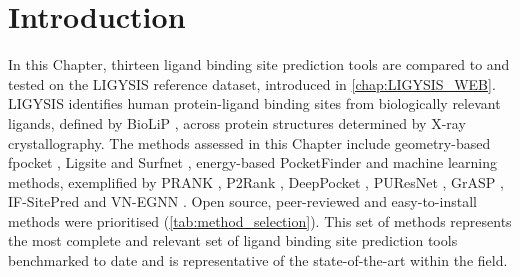 \section{Introduction}


In this Chapter, thirteen ligand binding site prediction tools are compared to and tested on the LIGYSIS reference dataset, introduced in \autoref{chap:LIGYSIS_WEB}. LIGYSIS identifies human protein-ligand binding sites from biologically relevant ligands, defined by BioLiP \cite{YANG_2013_BIOLIP}, across protein structures determined by X-ray crystallography. The methods assessed in this Chapter include geometry-based fpocket \cite{GUILLOUX_2009_FPOCKET}, Ligsite \cite{HENDLICH_1997_LIGSITE} and Surfnet \cite{LASKOWSKI_1995_SURFNET}, energy-based PocketFinder \cite{AN_2005_POCKETFINDER} and machine learning methods, exemplified by PRANK \cite{KRIVAK_2015_PRANK}, P2Rank \cite{KRIVAK_2015_P2RANK, KRIVAK_2018_P2RANK}, DeepPocket \cite{AGGARWAL_2022_DEEPPOCKET}, PUResNet \cite{KANDEL_2021_PURESNET, KANDEL_2024_PURESNET}, GrASP \cite{SMITH_2024_GrASP}, IF-SitePred \cite{CARBERY_2024_IFSP} and VN-EGNN \cite{SESTAK_2024_VNEGNN}. Open source, peer-reviewed and easy-to-install methods were prioritised (\autoref{tab:method_selection}). This set of methods represents the most complete and relevant set of ligand binding site prediction tools benchmarked to date and is representative of the state-of-the-art within the field.

